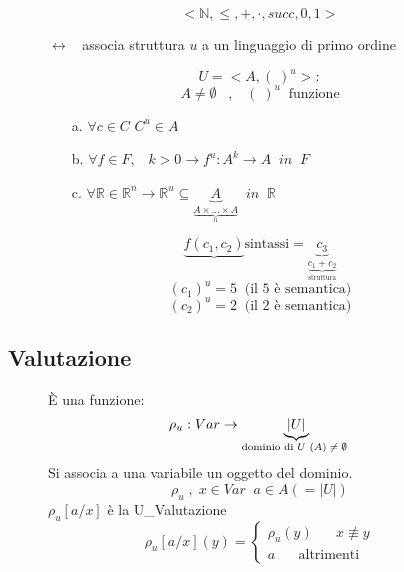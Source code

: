 \documentclass{article}
\theoremstyle{break}
\theoremstyle{break}
\theoremstyle{break}
\theoremstyle{break}
\begin{document}
\begin{figure}[H]
  \begin{example}
    \[
    <\mathbb{N}, \le , +, \cdot, succ, 0, 1> 
    \] 
  \end{example}
\end{figure}

\begin{figure}[H]
  \begin{definition}[L\_Struttura]
    \(
  \leftrightarrow\;\;     \) associa struttura \( u \) a un linguaggio di primo ordine

    \[
    U = <A, (\;)^u>:
    \] 
    \[
    A \neq \emptyset \;\;\;,\;\;\; (\;)^u \;\;\text{funzione}
    \]
    \begin{itemize}
      \item[a.] \( \forall c \in C \) \( C^u \in A \) 
      \item[b.] \( \forall f \in F, \;\;\; k>0 \to f^u : A^k \to A \;\; in \;\;F \) 
      \item [c.] \( \forall \mathbb{R} \in \mathbb{R}^n \to \mathbb{R}^u \subseteq \underbrace{A}_{\underbrace{A \times \ldots \times A}_{n}} \;\; in \;\;\mathbb{R} \) 
    \end{itemize}
  \end{definition}
  \[
    \underbrace{f(c_1,c_2)}{\text{sintassi}} = \underbrace{c_3}_{\underbrace{c_1+c_2}_{\text{struttura}}}
  \] 
  \[
    (c_1)^u = 5 \;\;\text{(il 5 è semantica)}
  \] 
  \[
    (c_2)^u = 2 \;\;\text{(il 2 è semantica)}
  \] 
\end{figure}

\subsection{Valutazione}

\begin{figure}[H]
  \begin{definition}
    È una funzione:
    \[
      \rho_u: Var \to \underbrace{|U|}_{\text{dominio di \( U \) \( (A) \neq \emptyset \)  }}
    \] 
    Si associa a una variabile un oggetto del dominio.
    \[
    \rho_u\;,\; x \in Var \;\; a \in A (=|U|)
    \] 
    \(
      \rho_u[a/x]
    \) è la U\_Valutazione
    \[
      \rho_u[a/x](y)= \begin{cases}
        \rho_u(y)\;\;\;\;\;\; x \not\equiv y\\
        a \;\;\;\;\;\; \text{altrimenti}
      \end{cases}    \] 
  \end{definition}
\end{figure}
\end{document}
